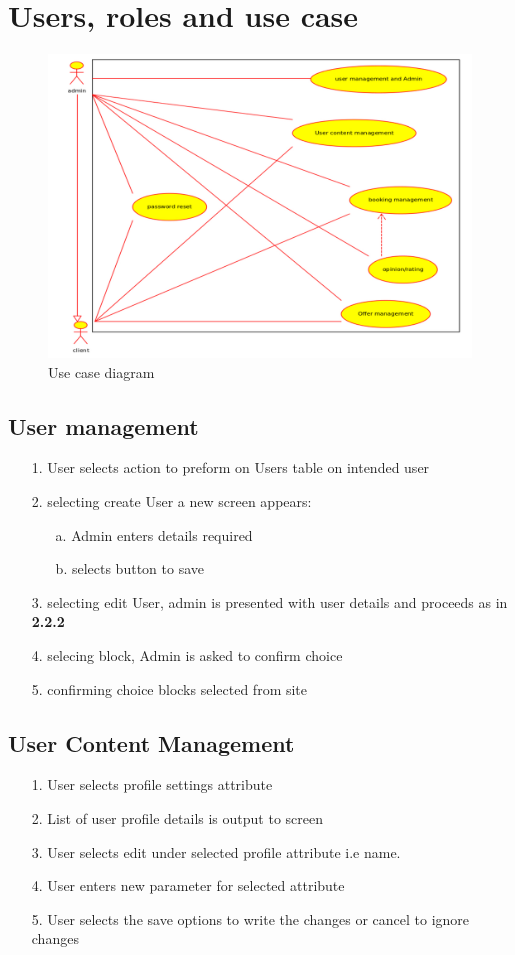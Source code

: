\section{Users, roles and use case}
\begin{figure}[h!]
\includegraphics[scale=0.3]{img/updated_use_case.jpg}
\caption{Use case diagram}
\end{figure}
\subsection {User management}
\begin{itemize}
\item[1.] User selects action to preform on Users table on intended user
\item[2.] selecting create User a new screen appears:
	\begin{itemize}
		\item[a.] Admin enters details required
		\item[b.] selects button to save 
	\end{itemize}
\item[3.] selecting edit User, admin is presented with user details and proceeds as in \textbf{2.2.2}
\item[4.] selecing block, Admin is asked to confirm choice
\item[5.] confirming choice blocks  selected from site
\end{itemize}
\newpage
\subsection {User Content Management}
\begin{itemize}
\item[1.] User selects profile settings attribute
\item[2.] List of user profile details is output to screen
\item[3.] User selects edit under selected profile attribute i.e name.
\item[4.] User enters new parameter for selected attribute
\item[5.] User selects the save options to write the changes or cancel to ignore changes
\end{itemize}

